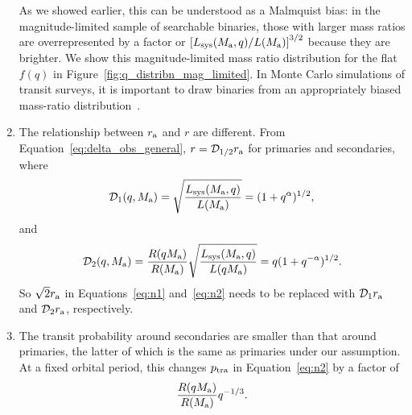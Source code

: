 \documentclass[12pt,modern]{aastex61}
\renewcommand{\a}{_{\rm a}}
\begin{document}
\begin{enumerate}
  As we showed earlier, this can be understood as a Malmquist bias: in
  the magnitude-limited sample of searchable binaries, those with
  larger mass ratios are overrepresented by a factor or
  $\left[{L_{\rm sys}(M\a, q)/L(M\a)}\right]^{3/2}$ because they are
  brighter. We show this magnitude-limited mass ratio distribution
  for the flat $f(q)$ in Figure~\ref{fig:q_distribn_mag_limited}.  In
  Monte Carlo simulations of transit surveys, it is important to
  draw binaries from an appropriately biased mass-ratio
  distribution~\citep[\textit{e.g.},][]{
    bakos_hatsouth:_2013,sullivan_transiting_2015,
    gunther_new_2017}.
%
  \item The relationship between $r\a$ and $r$ are different.  From
    Equation~\ref{eq:delta_obs_general}, $r=\mathcal{D}_{1/2}r\a$ for
    primaries and secondaries, where
  \begin{equation}
      \mathcal{D}_1(q, M\a)
      = \sqrt{L_{\rm sys}(M\a, q) \over L(M\a) }
      = (1+q^\alpha)^{1/2},
  \end{equation}
  and
  \begin{equation}
    \mathcal{D}_2(q, M\a)
    = {R(qM\a)\over R(M\a)}\sqrt{L_{\rm sys}(M\a, q) \over L(qM\a)} 
    = q (1+q^{-\alpha})^{1/2}.
  \end{equation}
  So $\sqrt{2}r\a$ in Equations~\ref{eq:n1} and~\ref{eq:n2} needs to be
  replaced with $\mathcal{D}_1r\a$ and $\mathcal{D}_2r\a$, respectively.

  \item The transit probability around secondaries are smaller than
  that around primaries, the latter of which is the same as
  primaries under our assumption. At a fixed orbital period, this
  changes $p_{\rm tra}$ in Equation~\ref{eq:n2} by a factor of
  \begin{equation}
    {R(qM\a) \over R(M\a)}q^{-1/3}.
  \end{equation}

\end{enumerate}
\end{document}
